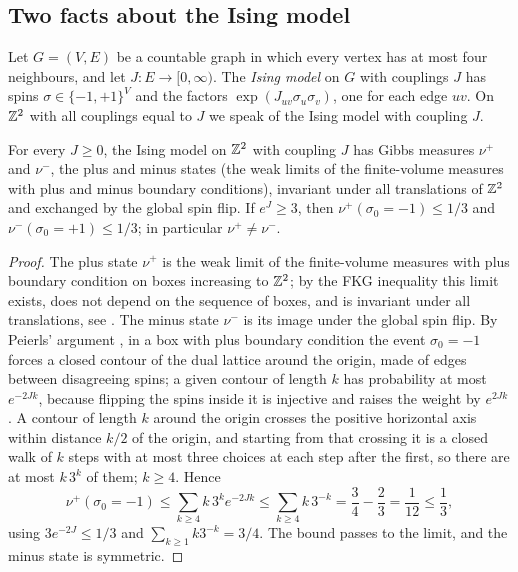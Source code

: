 \subsection{Two facts about the Ising model}\label{set:sub-ising}

Let $G=(V,E)$ be a countable graph in which every vertex has at most four neighbours, and let $J\colon E\to[0,\infty)$. The \emph{Ising model} on $G$ with couplings $J$ has spins $\sigma\in\{-1,+1\}^V$ and the factors $\exp(J_{uv}\sigma_u\sigma_v)$, one for each edge $uv$. On $\mathbb{Z}^2$ with all couplings equal to $J$ we speak of the Ising model with coupling $J$.

\begin{lemma}[Peierls]\label{set:peierls}
For every $J\ge0$, the Ising model on $\mathbb{Z}^2$ with coupling $J$ has Gibbs measures $\nu^+$ and $\nu^-$, the plus and minus states (the weak limits of the finite-volume measures with plus and minus boundary conditions), invariant under all translations of $\mathbb{Z}^2$ and exchanged by the global spin flip. If $e^{J}\ge3$, then $\nu^+(\sigma_0=-1)\le1/3$ and $\nu^-(\sigma_0=+1)\le1/3$; in particular $\nu^+\ne\nu^-$.
\end{lemma}

\begin{proof}
The plus state $\nu^+$ is the weak limit of the finite-volume measures with plus boundary condition on boxes increasing to $\mathbb{Z}^2$; by the FKG inequality this limit exists, does not depend on the sequence of boxes, and is invariant under all translations, see \cite[Chapter~3]{FriedliVelenik17}. The minus state $\nu^-$ is its image under the global spin flip. By Peierls' argument \cite{Peierls36}, in a box with plus boundary condition the event $\sigma_0=-1$ forces a closed contour of the dual lattice around the origin, made of edges between disagreeing spins; a given contour of length $k$ has probability at most $e^{-2Jk}$, because flipping the spins inside it is injective and raises the weight by $e^{2Jk}$. A contour of length $k$ around the origin crosses the positive horizontal axis within distance $k/2$ of the origin, and starting from that crossing it is a closed walk of $k$ steps with at most three choices at each step after the first, so there are at most $k\,3^{k}$ of them; $k\ge4$. Hence
\[
\nu^+(\sigma_0=-1)\le\sum_{k\ge4}k\,3^{k}e^{-2Jk}\le\sum_{k\ge4}k\,3^{-k}=\frac34-\frac23=\frac1{12}\le\frac13,
\]
using $3e^{-2J}\le1/3$ and $\sum_{k\ge1}k3^{-k}=3/4$. The bound passes to the limit, and the minus state is symmetric.
\end{proof}

